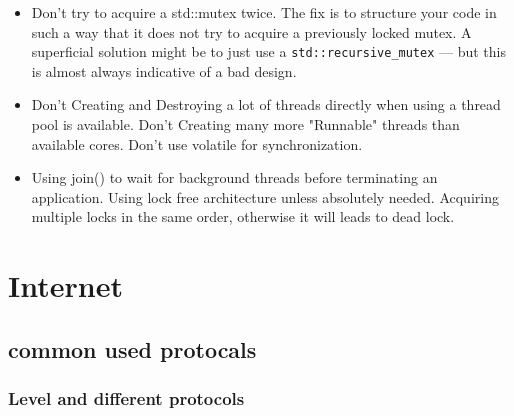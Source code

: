 \documentclass[a4paper,11pt,twoside]{book}
\begin{document}
\begin{itemize}
    
    \item Don't try to acquire a std::mutex twice. The fix is to structure your code in such a way that it does not try to acquire a previously locked mutex. A superficial solution might be to just use a \texttt{std::recursive\_mutex} — but this is almost always indicative of a bad design.

    \item Don't Creating and Destroying a lot of threads directly when using a thread pool is available. Don't Creating many more "Runnable" threads than available cores. Don't use volatile for synchronization.
    
    \item Using join() to wait for background threads before terminating an application. Using lock free architecture unless absolutely needed. Acquiring multiple locks in the same order, otherwise it will leads to dead lock.
    
\end{itemize}

\def\sixth{}
\ifdefined\sixth

\chapter{Internet}
\section{common used protocals}
\subsection{Level and different protocols}
\end{document}
